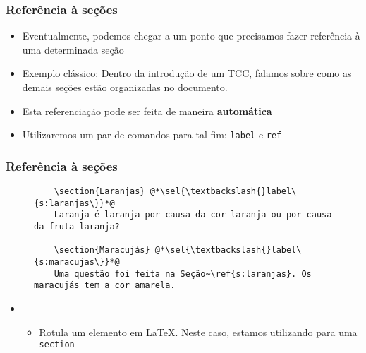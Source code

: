 \begin{frame}[fragile] \frametitle{Referência à seções}
\begin{itemize}
	\item Eventualmente, podemos chegar a um ponto que precisamos fazer referência à uma determinada seção
	\item Exemplo clássico: Dentro da introdução de um TCC, falamos sobre como as demais seções estão organizadas no documento.
	\item Esta referenciação pode ser feita de maneira \textbf{automática}
	\item Utilizaremos um par de comandos para tal fim: \texttt{label} e \texttt{ref}
\end{itemize}
\end{frame}

\begin{frame}[fragile] \frametitle{Referência à seções}
\begin{figure}[!t]
\begin{lstlisting}
	\section{Laranjas} @*\sel{\textbackslash{}label\{s:laranjas\}}*@
	Laranja é laranja por causa da cor laranja ou por causa da fruta laranja?

	\section{Maracujás} @*\sel{\textbackslash{}label\{s:maracujas\}}*@
	Uma questão foi feita na Seção~\ref{s:laranjas}. Os maracujás tem a cor amarela.
\end{lstlisting}
\end{figure}

\begin{itemize}
	\item {}
	\begin{itemize}
		\item Rotula um elemento em LaTeX. Neste caso, estamos utilizando para uma \texttt{section}
	\end{itemize}
\end{itemize}
\end{frame}


